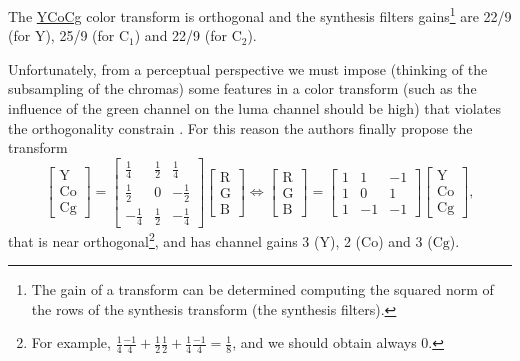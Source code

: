 The \href{https://en.wikipedia.org/wiki/YCoCg}{YCoCg} color transform
is orthogonal and the synthesis filters gains\footnote{The gain of a
transform can be determined computing the squared norm of the rows of
the synthesis transform (the synthesis filters).} are 22/9 (for
$\text{Y}$), 25/9 (for $\text{C}_1$) and 22/9 (for $\text{C}_2$).

Unfortunately, from a perceptual perspective we must impose (thinking
of the subsampling of the chromas) some features in a color transform
(such as the influence of the green channel on the luma channel should
be high) that violates the orthogonality constrain
\cite{malvar2008lifting}. For this reason the authors finally propose
the transform
\begin{equation}
  \begin{bmatrix}
    \text{Y} \\
    \text{Co} \\
    \text{Cg}
  \end{bmatrix}
  =
  \begin{bmatrix}
    \frac{1}{4} &  \frac{1}{2}  &  \frac{1}{4} \\ 
    \frac{1}{2} &            0  & -\frac{1}{2} \\
    -\frac{1}{4} &  \frac{1}{2}  & -\frac{1}{4}
  \end{bmatrix}
  \begin{bmatrix}
    \text{R} \\
    \text{G} \\
    \text{B}
  \end{bmatrix}
  \Leftrightarrow
  \begin{bmatrix}
    \text{R} \\
    \text{G} \\
    \text{B}
  \end{bmatrix}
  =
  \begin{bmatrix}
    1  &  1  & -1 \\ 
    1  &  0  &  1 \\ 
    1  & -1  & -1
  \end{bmatrix}
  \begin{bmatrix}
    \text{Y} \\
    \text{Co} \\
    \text{Cg}
  \end{bmatrix},
\end{equation}
that is near orthogonal\footnote{For example, $\frac{1}{4}\frac{-1}{4}
+ \frac{1}{2}\frac{1}{2} + \frac{1}{4}\frac{-1}{4} = \frac{1}{8}$, and
we should obtain always 0.}, and has channel gains 3 ($\text{Y}$), 2
($\text{Co}$) and 3 ($\text{Cg}$). %

